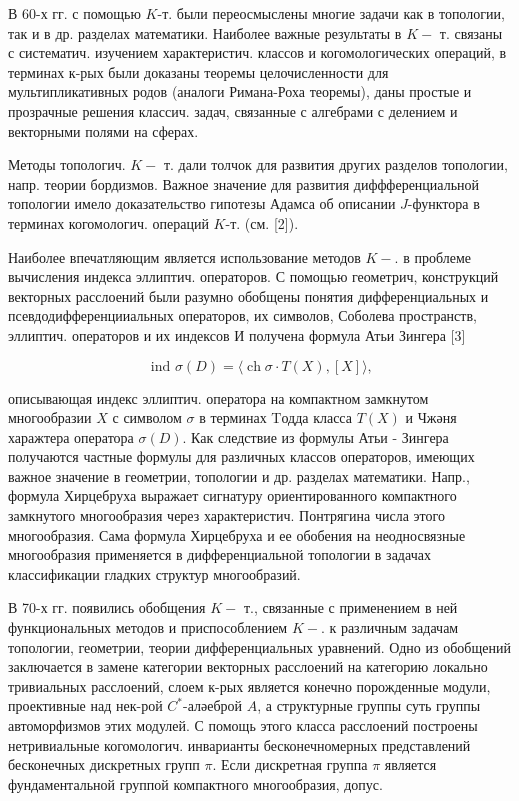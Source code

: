 \documentclass[10pt]{article}
\begin{document}
В 60-х гг. с помощью $K$-т. были переосмыслены многие задачи как в топологии, так и в др. разделах математики. Наиболее важные результаты в $K-$ т. связаны с систематич. изучением характеристич. классов и когомологических операций, в терминах к-рых были доказаны теоремы целочисленности для мультипликативных родов (аналоги Римана-Роха теоремы), даны простые и прозрачные решения классич. задач, связанные с алгебрами с делением и векторными полями на сферах.



Методы топологич. $K-$ т. дали толчок для развития других разделов топологии, напр. теории бордизмов. Важное значение для развития диффференциальной топологии имело доказательство гипотезы Адамса об описании $J$-функтора в терминах когомологич. операций $K$-т. (см. [2]).



Наиболее впечатляющим является использование методов $K-$. в проблеме вычисления индекса эллиптич. операторов. С помощью геометрич, конструкций векторных расслоений были разумно обобщены понятия дифференциальных и псевдодифференцииальных операторов, их символов, Соболева пространств, эллиптич. операторов и их индексов И получена формула Атьи Зингера [3]



\[

\text { ind } \sigma(D)=\langle\operatorname{ch} \sigma \cdot T(X),[X]\rangle,

\]



описывающая индекс эллиптич. оператора на компактном замкнутом многообразии $X$ с символом $\sigma$ в терминах Tодда класса $T(X)$ и Чжәня харажтера оператора $\sigma(D)$. Как следствие из формулы Атьи - Зингера получаются частные формулы для различных классов операторов, имеющих важное значение в геометрии, топологии и др. разделах математики. Напр., формула Хирцебруха выражает сигнатуру ориентированного компактного замкнутого многообразия через характеристич. Понтрягина числа этого многообразия. Сама формула Хирцебруха и ее обобения на неодносвязные многообразия применяется в дифференциальной топологии в задачах классификации гладких структур многообразий.



В 70-х гг. появились обобщения $K-$ т., связанные с применением в ней функциональных методов и приспособлением $K-$. к различным задачам топологии, геометрии, теории дифференциальных уравнений. Одно из обобщений заключается в замене категории векторных расслоений на категорию локально тривиальных расслоений, слоем к-рых является конечно порожденные модули, проективные над нек-рой $C^{*}$-аләеброй $A$, а структурные группы суть группы автоморфизмов этих модулей. С помощь этого класса расслоений построены нетривиальные когомологич. инварианты бесконечномерных представлений бесконечных дискретных групп $\pi$. Если дискретная группа $\pi$ является фундаментальной группой компактного многообразия, допус.
\end{document}
